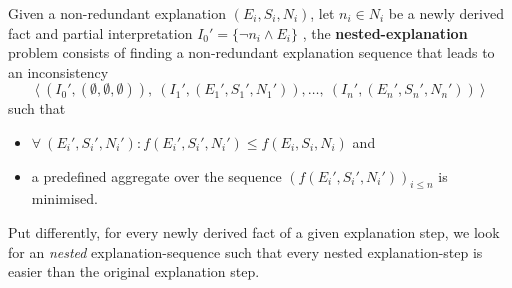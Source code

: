 \begin{definition}
    Given a non-redundant explanation $(E_i, S_i, N_i)$, let $n_i \in N_i$ be a newly derived fact and partial interpretation  $I_0' = \{ \neg n_i \wedge E_i \}$ , the \textbf{nested-explanation} problem consists of finding a non-redundant explanation sequence that leads to an inconsistency 
    \[\langle \ (I_0',(\emptyset,\emptyset,\emptyset)),\ (I_1',(E_1',S_1',N_1')), \dots ,\ (I_n',(E_n',S_n',N_n')) \ \rangle\]
    such that 
    \begin{itemize}
        \item $\forall \ (E_i',S_i',N_i') : f(E_i',S_i',N_i') \leq f(E_i, S_i, N_i)$ and 
        \item a predefined aggregate over the sequence $\left(f(E_i',S_i',N_i')\right)_{i\leq n}$ is minimised.
    \end{itemize} 
\end{definition}

Put differently, for every newly derived fact of a given explanation step, we look for an \emph{nested} explanation-sequence such that every nested explanation-step is easier than the original explanation step.


